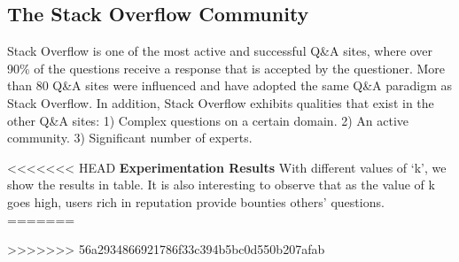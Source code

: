 \subsection{The Stack Overflow Community}
	Stack Overflow is one of the most active and successful Q\&A sites, where over 90\% of the questions receive a response that is accepted by the questioner. More than 80 Q\&A sites were influenced and have adopted the same Q\&A paradigm as Stack Overflow. In addition, Stack Overflow exhibits qualities that exist in the other Q\&A sites: 1) Complex questions on a certain domain. 2) An active community. 3) Significant number of experts.

<<<<<<< HEAD
\textbf{Experimentation Results} 
With different values of ‘k’, we show the results in table. It is also interesting to observe that as the value of k goes high, users rich in reputation provide bounties others’ questions.
=======

>>>>>>> 56a2934866921786f33c394b5bc0d550b207afab







